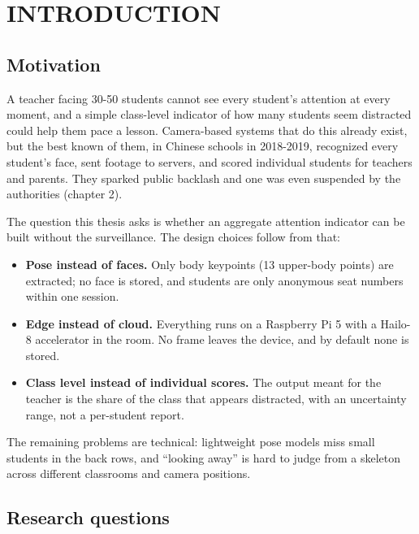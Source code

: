 \chapter{INTRODUCTION}

\section{Motivation}

A teacher facing 30-50 students cannot see every student's attention at every moment, and a simple class-level indicator of how many students seem distracted could help them pace a lesson. Camera-based systems that do this already exist, but the best known of them, in Chinese schools in 2018-2019, recognized every student's face, sent footage to servers, and scored individual students for teachers and parents. They sparked public backlash and one was even suspended by the authorities (chapter 2).

The question this thesis asks is whether an aggregate attention indicator can be built without the surveillance. The design choices follow from that:

\begin{itemize}
\tightlist
\item
  \textbf{Pose instead of faces.} Only body keypoints (13 upper-body points) are extracted; no face is stored, and students are only anonymous seat numbers within one session.
\item
  \textbf{Edge instead of cloud.} Everything runs on a Raspberry Pi 5 with a Hailo-8 accelerator in the room. No frame leaves the device, and by default none is stored.
\item
  \textbf{Class level instead of individual scores.} The output meant for the teacher is the share of the class that appears distracted, with an uncertainty range, not a per-student report.
\end{itemize}

The remaining problems are technical: lightweight pose models miss small students in the back rows, and ``looking away'' is hard to judge from a skeleton across different classrooms and camera positions.

\section{Research questions}

